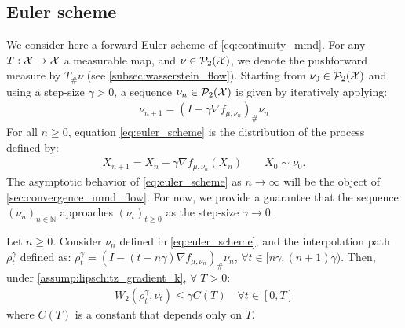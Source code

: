\subsection{Euler scheme}
We consider here a forward-Euler scheme of \cref{eq:continuity_mmd}. For any $T: {{\mathcal X}} \rightarrow {{\mathcal X}}$ a measurable map, and $\nu \in \mathcal{P}_2({{\mathcal X}})$, we denote the pushforward measure by $T_{\#}\nu$ (see \cref{subsec:wasserstein_flow}). Starting from $\nu_0\in \mathcal{P}_2({{\mathcal X}})$ and using a step-size $\gamma>0$, a sequence $\nu_n\in \mathcal{P}_2({{\mathcal X}})$ is given by iteratively applying:
\begin{align}\label{eq:euler_scheme}
	\nu_{n+1} = (I - \gamma \nabla f_{\mu,\nu_n})_{\#}\nu_n
\end{align} 
For all $n\ge 0$, equation \cref{eq:euler_scheme} is the distribution of the process defined by:
\begin{align}\label{eq:euler_scheme_particles}
	X_{n+1} = X_n - \gamma \nabla f_{\mu,\nu_n}(X_n) \qquad X_0\sim \nu_0.
\end{align}
The asymptotic behavior of \cref{eq:euler_scheme} as $n\rightarrow \infty$ %
will be the object of \cref{sec:convergence_mmd_flow}. For now, we provide a guarantee that the sequence $(\nu_n)_{n\in \mathbb{N}}$ approaches $(\nu_t)_{t\geq 0}$ as the step-size $\gamma\rightarrow 0$.
\begin{proposition}\label{prop:convergence_euler_scheme}
	Let $n\ge0$. Consider $\nu_n$ defined in \cref{eq:euler_scheme}, and the interpolation path $\rho_t^{\gamma}$ defined as: $\rho_t^{\gamma} = (I-(t- n\gamma) \nabla f_{\mu,\nu_n})_{\#}\nu_n$, $\forall t\in [n\gamma,(n+1)\gamma)$. Then, under \cref{assump:lipschitz_gradient_k},  $\forall \;T>0$:%
	\begin{align}
		W_2(\rho_t^{\gamma},\nu_t)\leq \gamma C(T) \quad \forall t\in [0,T]
	\end{align}
	where $C(T)$ is a constant that depends only on $T$.
\end{proposition} 
